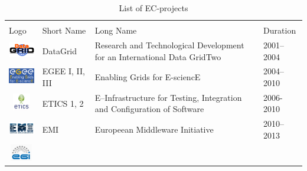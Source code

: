 \documentclass[journal]{IEEEtran}
\begin{document}
\begin{table}[!h]
\renewcommand{\arraystretch}{1.3}
\caption{List of EC-projects}
\label{tab:eup}
\centering
\begin{tabular}{p{1.6cm}p{1.5cm}p{3cm}l}
\hline
\hline
\\
Logo & Short Name & Long Name & Duration\\
\hline
\hline
\begin{minipage}{.3\textwidth}
\includegraphics[width=15mm,height=7.5mm]{images/datagrid}
\end{minipage}
    & DataGrid &
Research and Technological Development for an International Data GridTwo & 2001--2004\\
\begin{minipage}{.3\textwidth}
\includegraphics[width=15mm,height=7.5mm]{images/egee}
\end{minipage}
     & EGEE I, II, III &
Enabling Grids for E-sciencE & 2004--2010\\
\begin{minipage}{.3\textwidth}
\includegraphics[width=15mm,height=7.5mm]{images/etics}
\end{minipage}
     & ETICS 1, 2 &
E--Infrastructure for Testing, Integration and Configuration of Software & 2006-2010\\
\begin{minipage}{.3\textwidth}
\includegraphics[width=15mm,height=7.5mm]{images/emi}
\end{minipage}
     & EMI &
Europeean Middleware Initiative & 2010--2013\\
\begin{minipage}{.3\textwidth}
\includegraphics[width=15mm,height=7.5mm]{images/egi}

\end{minipage}
\end{tabular}
\end{table}
\end{document}
